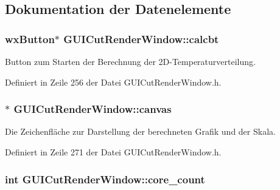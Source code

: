 \subsection{Dokumentation der Datenelemente}
\hypertarget{classGUICutRenderWindow_a7cadc8f5fd1b153ba21aa82fd5f70eff}{
\subsubsection[{calcbt}]{\setlength{\rightskip}{0pt plus 5cm}wx\-Button$\ast$ G\-U\-I\-Cut\-Render\-Window\-::calcbt\hspace{0.3cm}{\ttfamily [private]}}}\label{classGUICutRenderWindow_a7cadc8f5fd1b153ba21aa82fd5f70eff}


Button zum Starten der Berechnung der 2\-D-\/\-Temperaturverteilung. 



Definiert in Zeile 256 der Datei G\-U\-I\-Cut\-Render\-Window.\-h.

\hypertarget{classGUICutRenderWindow_abbaa6c66e8aa9fee96ba20a9a29e1a18}{
\subsubsection[{canvas}]{$\ast$ G\-U\-I\-Cut\-Render\-Window\-::canvas\hspace{0.3cm}{\ttfamily [private]}}}\label{classGUICutRenderWindow_abbaa6c66e8aa9fee96ba20a9a29e1a18}


Die Zeichenfläche zur Darstellung der berechneten Grafik und der Skala. 



Definiert in Zeile 271 der Datei G\-U\-I\-Cut\-Render\-Window.\-h.

\hypertarget{classGUICutRenderWindow_a365103460aeafd2173c0a9360cc0caa1}{
\subsubsection[{core\-\_\-count}]{\setlength{\rightskip}{0pt plus 5cm}int G\-U\-I\-Cut\-Render\-Window\-::core\-\_\-count\hspace{0.3cm}{\ttfamily [private]}}}\label{classGUICutRenderWindow_a365103460aeafd2173c0a9360cc0caa1}


